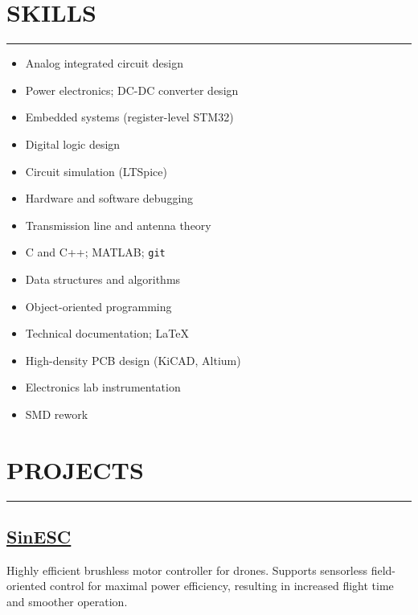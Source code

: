 

	\maketitle
	\section*{SKILLS}
	\hrule\medskip
	\begin{minipage}{0.5\textwidth}
		\begin{itemize}[itemsep=0em]
			\item Analog integrated circuit design
			\item Power electronics; DC-DC converter design
			\item Embedded systems (register-level STM32)
			\item Digital logic design
			\item Circuit simulation (LTSpice)
			\item Hardware and software debugging
			\item Transmission line and antenna theory
		\end{itemize}
	\end{minipage}%
	\begin{minipage}{0.5\textwidth}
		\begin{itemize}[itemsep=0em]
			\item C and C++; MATLAB; \texttt{git}
			\item Data structures and algorithms
			\item Object-oriented programming
			\item Technical documentation; \LaTeX
			\item High-density PCB design (KiCAD, Altium)
			\item Electronics lab instrumentation
			\item SMD rework
		\end{itemize}
	\end{minipage}
	\section*{PROJECTS}
	\hrule\smallskip
	\subsection{\href{https://github.com/SAR-mango/SinESC}{SinESC}}
	Highly efficient brushless motor controller for drones. Supports sensorless field-oriented control for maximal power efficiency, resulting in increased flight time and smoother operation.
